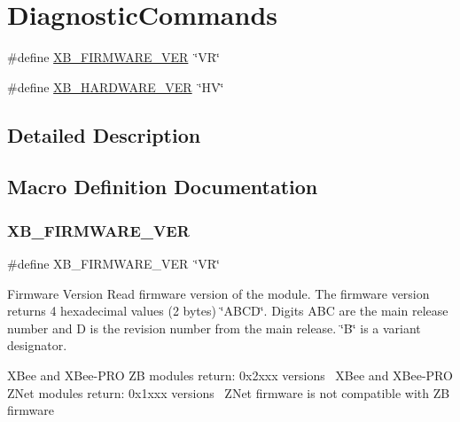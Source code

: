\hypertarget{group___diagnostic_commands}{}\section{Diagnostic\+Commands}
\label{group___diagnostic_commands}
\begin{DoxyCompactItemize}
\item 
\#define \mbox{\hyperlink{group___diagnostic_commands_ga604d8e87718a1dc53cded0e3c020fc40}{X\+B\+\_\+\+F\+I\+R\+M\+W\+A\+R\+E\+\_\+\+V\+ER}}~\char`\"{}VR\char`\"{}
\item 
\#define \mbox{\hyperlink{group___diagnostic_commands_ga58a2fc2812c3b0fd035f22391354ec16}{X\+B\+\_\+\+H\+A\+R\+D\+W\+A\+R\+E\+\_\+\+V\+ER}}~\char`\"{}HV\char`\"{}
\end{DoxyCompactItemize}


\subsection{Detailed Description}


\subsection{Macro Definition Documentation}
\mbox{\label{group___diagnostic_commands_ga604d8e87718a1dc53cded0e3c020fc40}} 
\subsubsection{\texorpdfstring{X\+B\+\_\+\+F\+I\+R\+M\+W\+A\+R\+E\+\_\+\+V\+ER}{XB\_FIRMWARE\_VER}}
{\footnotesize\ttfamily \#define X\+B\+\_\+\+F\+I\+R\+M\+W\+A\+R\+E\+\_\+\+V\+ER~\char`\"{}VR\char`\"{}}

Firmware Version Read firmware version of the module. The firmware version returns 4 hexadecimal values (2 bytes) \char`\"{}\+A\+B\+C\+D\char`\"{}. Digits A\+BC are the main release number and D is the revision number from the main release. \char`\"{}\+B\char`\"{} is a variant designator.

X\+Bee and X\+Bee-\/\+P\+RO ZB modules return\+: 0x2xxx versions~\newline
X\+Bee and X\+Bee-\/\+P\+RO Z\+Net modules return\+: 0x1xxx versions~\newline
 Z\+Net firmware is not compatible with ZB firmware

